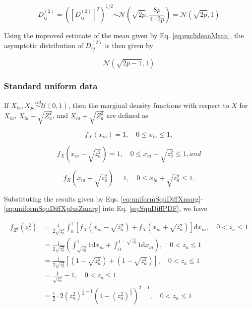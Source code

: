 \documentclass[10pt,letterpaper]{article}\usepackage[]{graphicx}\usepackage[]{color}
\begin{document}
\begin{equation}\label{eq:normalEucDistr}
D^{(2)}_{ij} = \left(\left[D^{(2)}_{ij}\right]^2\right)^{1/2} \overset{.}{\sim} \mathcal{N}\left(\sqrt{2p},\frac{8p}{4 \cdot 2p}\right) = \mathcal{N}\left(\sqrt{2p},1\right)
\end{equation}

Using the improved estimate of the mean given by Eq. \ref{eq:euclideanMean}, the asymptotic distribution of $D^{(2)}_{ij}$ is then given by

\begin{equation}\label{eq:normalEucDistr2}
\mathcal{N}\left(\sqrt{2p - 1},1\right)
\end{equation}

\subsubsection{Standard uniform data}

If $X_{ia},X_{ja} \overset{iid}{\sim} \mathcal{U}(0,1)$, then the marginal density functions with respect to $X$ for $X_{ia}$, $X_{ia} - \sqrt{Z^2_a}$, and $X_{ia} + \sqrt{Z^2_a}$ are defined as

\begin{equation}\label{eq:uniformSquDiffXmarg}
f_X(x_{ia}) = 1, \quad 0 \leq x_{ia} \leq 1,
\end{equation}

\begin{equation}\label{eq:uniformSquDiffXminusZmarg}
f_X(x_{ia} - \sqrt{z^2_a}) = 1, \quad 0 \leq x_{ia} - \sqrt{z^2_a} \leq 1, and
\end{equation}

\begin{equation}\label{eq:uniformSquDiffXplusZmarg}
f_X(x_{ia} + \sqrt{z^2_a}) = 1, \quad 0 \leq x_{ia} + \sqrt{z^2_a} \leq 1.
\end{equation}

Substituting the results given by Eqs. \ref{eq:uniformSquDiffXmarg}-\ref{eq:uniformSquDiffXplusZmarg} into Eq. \ref{eq:SquDiffPDF}, we have

\begin{equation}\label{eq:uniformSquDiffPDF}
\begin{aligned}
f_{Z^2}(z^2_a) &= \frac{1}{2\sqrt{z^2_a}} \int_{0}^{1} \left[f_X\left(x_{ia} - \sqrt{z^2_a}\right) + f_X\left(x_{ia} + \sqrt{z^2_a}\right)\right] \text{d}x_{ia}, \quad 0 < z_a \leq 1\\
&= \frac{1}{2\sqrt{z^2_a}}\left(\int_{\sqrt{z^2_a}}^{1}1\text{d}x_{ia} + \int_{0}^{1 - \sqrt{z^2_a}}1\text{d}x_{ia}\right), \quad 0 < z_a \leq 1 \\
&= \frac{1}{2\sqrt{z^2_a}}[(1 - \sqrt{z^2_a}) + (1 - \sqrt{z^2_a})], \quad 0 < z_a \leq 1 \\
&= \frac{1}{\sqrt{z^2_a}} - 1, \quad 0 < z_a \leq 1 \\
&= \frac{1}{2} \cdot 2 \left(z^2_a\right)^{\frac{1}{2} - 1}\left(1 - \left(z^2_a\right)^{\frac{1}{2}}\right)^{2 - 1}, \quad 0 < z_a \leq 1
\end{aligned}
\end{equation}
\end{document}
